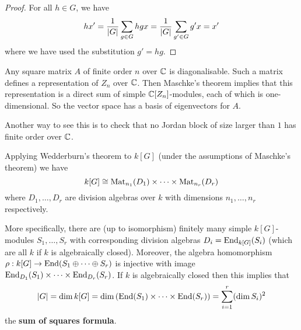 \begin{proof}
	For all $h \in G$, we have
	\[hx' = \frac 1{\left\lvert G \right\rvert} \sum_{g \in G} hgx = \frac 1{\left\lvert G \right\rvert} \sum_{g' \in G} g'x = x'\]
	where we have used the substitution $g'=hg$.
\end{proof}

\begin{cor}
	\leavevmode
	\begin{enum}
		\io
		Any square matrix $A$ of finite order $n$ over $\mathbb{C}$ is diagonalisable.
		Such a matrix defines a representation of $Z_n$ over $\mathbb{C}$.
		Then Maschke's theorem implies that this representation is a direct sum of simple $\mathbb{C}[Z_n]$-modules, each of which is one-dimensional.
		So the vector space has a basis of eigenvectors for $A$.
		
		Another way to see this is to check that no Jordan block of size larger than $1$ has finite order over $\mathbb{C}$.
		
		\io
		Applying Wedderburn's theorem to $k[G]$ (under the assumptions of Maschke's theorem) we have
		\[k[G] \cong \operatorname{Mat}_{n_1}(D_1) \times \cdots \times \operatorname{Mat}_{n_r}(D_r)\]
		where $D_1,\ldots,D_r$ are division algebras over $k$ with dimensions $n_1,\ldots,n_r$ respectively.
		
		More specifically, there are (up to isomorphism) finitely many simple $k[G]$-modules $S_1,\ldots,S_r$ with corresponding division algebras $D_i=\operatorname{End}_{k[G]}(S_i)$ (which are all $k$ if $k$ is algebraically closed).
		Moreover, the algebra homomorphism $\rho: k[G] \to \operatorname{End}(S_1\oplus\cdots\oplus S_r)$ is injective with image $\operatorname{End}_{D_1}(S_1)\times\cdots\times\operatorname{End}_{D_r}(S_r)$.
		If $k$ is algebraically closed then this implies that
		\[\left\lvert G \right\rvert = \dim k[G] = \dim\left(\operatorname{End}(S_1)\times\cdots\times\operatorname{End}(S_r)\right) = \sum_{i=1}^r (\dim S_i)^2\]
		the \textbf{sum of squares formula}.
	\end{enum}
\end{cor}

